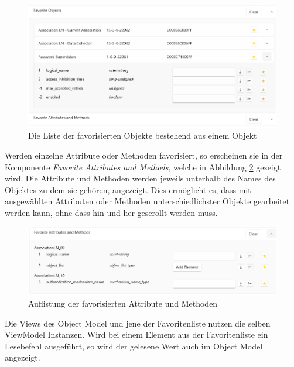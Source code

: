 \begin{figure}
   \centering
   \includegraphics[width=1.0\textwidth]{gfx/favoritesUi.png}
   \caption{
      Die Liste der favorisierten Objekte bestehend aus einem Objekt
      }
   \label{fig:favoritesUi}
\end{figure}

Werden einzelne Attribute oder Methoden favorisiert, so erscheinen sie in der Komponente \textit{Favorite Attributes and Methods}, welche in Abbildung \ref{fig:favoriteAttribtuesAndMethods} gezeigt wird.
Die Attribute und Methoden werden jeweils unterhalb des Names des Objektes zu dem sie gehören, angezeigt.
Dies ermöglicht es, dass mit ausgewählten Attributen oder Methoden unterschiedlichster Objekte gearbeitet werden kann, ohne dass hin und her gescrollt werden muss.
\begin{figure}
   \centering
   \includegraphics[width=1.0\textwidth]{gfx/favoriteAttributeAndMethods.png}
   \caption{
     Auflistung der favorisierten Attribute und Methoden
      }
   \label{fig:favoriteAttribtuesAndMethods}
\end{figure}

Die Views des Object Model und jene der Favoritenliste nutzen die selben ViewModel Instanzen.
Wird bei einem Element aus der Favoritenliste ein Lesebefehl ausgeführt, so wird der gelesene Wert auch im Object Model angezeigt.